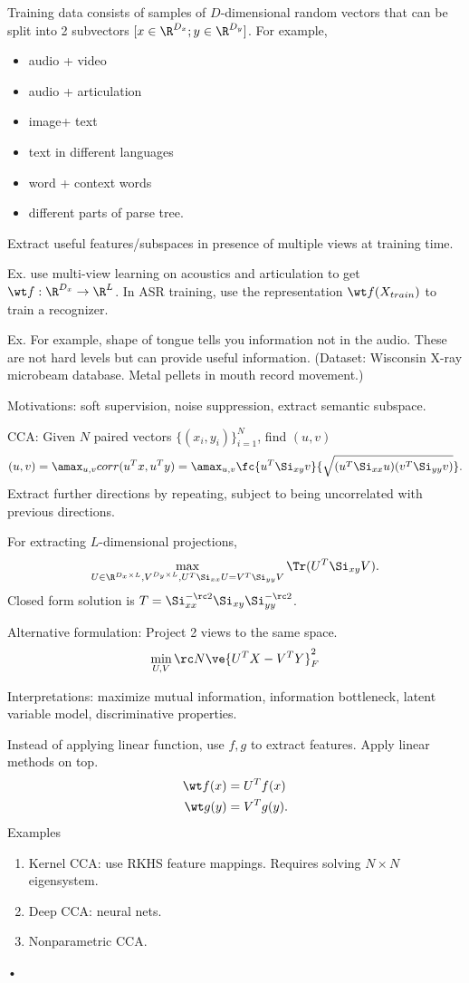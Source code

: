 Training data consists of samples of $D$-dimensional random vectors that can be split into 2 subvectors $[x\in \R^{D_x};y\in \R^{D_y}]$.  For example,
\begin{itemize}
\item
audio + video
\item
audio + articulation
\item
image+ text
\item
text in different languages
\item
word + context words
\item
different parts of parse tree.
\end{itemize}
Extract useful features/subspaces in presence of multiple views at training time.

Ex. use multi-view learning on acoustics and articulation to get $\wt f:\R^{D_x}\to \R^L$. In ASR training, use the representation $\wt f(X_{train})$ to train a recognizer.

Ex. For example, shape of tongue tells you information not in the audio. These are not hard levels but can provide useful information. (Dataset: Wisconsin X-ray microbeam database. Metal pellets in mouth record movement.)

Motivations: soft supervision, noise suppression, extract semantic subspace.

CCA: Given $N$ paired vectors $\{(x_i,y_i)\}_{i=1}^N$, find $(u,v)$
$$
(u,v) = \amax_{u,v} corr(u^Tx,u^Ty) = \amax_{u,v} \fc{u^T \Si_{xy}v}{\sqrt{(u^T \Si_{xx}u)(v^T \Si_{yy}v)}}.
$$
Extract further directions by repeating, subject to being uncorrelated with previous directions.

For extracting $L$-dimensional projections,
$$
\max_{U\in \R^{D_x\times L},V^{D_y\times L},U^T\Si_{xx}U = V^T\Si_{yy}V} \Tr(U^T\Si_{xy}V).
$$
Closed form solution is $T=\Si_{xx}^{-\rc 2} \Si_{xy} \Si_{yy}^{-\rc2}$.

Alternative formulation: Project 2 views to the same space.
$$
\min_{U,V} \rc N\ve{U^TX-V^TY}_F^2
$$

Interpretations: maximize mutual information, information bottleneck, latent variable model, discriminative properties.

Instead of applying linear function, use $f,g$ to extract features. Apply linear methods on top. 
\begin{align}
\wt f(x) &= U^Tf(x)\\
\wt g(y) &= V^T g(y).
\end{align}
Examples
\begin{enumerate}
\item
Kernel CCA: use RKHS feature mappings. Requires solving $N\times N$ eigensystem.
\item
Deep CCA: neural nets.
\item
Nonparametric CCA.
\end{enumerate}•

